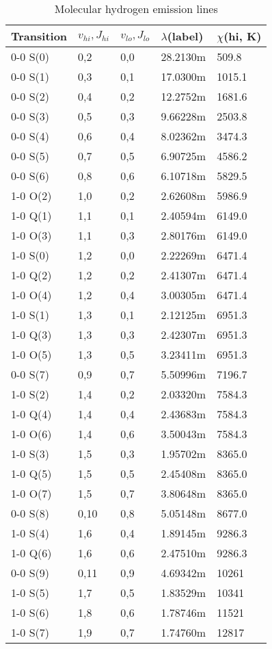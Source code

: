 \begin{table}
\centering
\caption{\label{tab:MolecularHydrogenLines}Molecular hydrogen emission lines}
\begin{tabular}{lllll}
\hline
Transition& $v_{hi},J_{hi}$& $v_{lo},J_{lo}$& $\lambda$(label)& $\chi$(hi,
K)\\
\hline
0-0 S(0)& 0,2 & 0,0& 28.2130m & 509.8\\
0-0 S(1)& 0,3 & 0,1& 17.0300m & 1015.1\\
0-0 S(2)& 0,4 & 0,2& 12.2752m & 1681.6\\
0-0 S(3)& 0,5 & 0,3& 9.66228m & 2503.8\\
0-0 S(4)& 0,6 & 0,4& 8.02362m & 3474.3\\
0-0 S(5)& 0,7 & 0,5& 6.90725m & 4586.2\\
0-0 S(6)& 0,8 & 0,6& 6.10718m & 5829.5\\
1-0 O(2)& 1,0 & 0,2& 2.62608m & 5986.9\\
1-0 Q(1)& 1,1 & 0,1& 2.40594m & 6149.0\\
1-0 O(3)& 1,1 & 0,3& 2.80176m & 6149.0\\
1-0 S(0)& 1,2 & 0,0& 2.22269m & 6471.4\\
1-0 Q(2)& 1,2 & 0,2& 2.41307m & 6471.4\\
1-0 O(4)& 1,2 & 0,4& 3.00305m & 6471.4\\
1-0 S(1)& 1,3 & 0,1& 2.12125m & 6951.3\\
1-0 Q(3)& 1,3 & 0,3& 2.42307m & 6951.3\\
1-0 O(5)& 1,3 & 0,5& 3.23411m & 6951.3\\
0-0 S(7)& 0,9 & 0,7& 5.50996m & 7196.7\\
1-0 S(2)& 1,4 & 0,2& 2.03320m & 7584.3\\
1-0 Q(4)& 1,4 & 0,4& 2.43683m & 7584.3\\
1-0 O(6)& 1,4 & 0,6& 3.50043m & 7584.3\\
1-0 S(3)& 1,5 & 0,3& 1.95702m & 8365.0\\
1-0 Q(5)& 1,5 & 0,5& 2.45408m & 8365.0\\
1-0 O(7)& 1,5 & 0,7& 3.80648m & 8365.0\\
0-0 S(8)& 0,10& 0,8& 5.05148m & 8677.0\\
1-0 S(4)& 1,6 & 0,4& 1.89145m & 9286.3\\
1-0 Q(6)& 1,6 & 0,6& 2.47510m & 9286.3\\
0-0 S(9)& 0,11& 0,9& 4.69342m & 10261\\
1-0 S(5)& 1,7 & 0,5& 1.83529m & 10341\\
1-0 S(6)& 1,8 & 0,6& 1.78746m & 11521\\
1-0 S(7)& 1,9 & 0,7& 1.74760m & 12817\\
\hline
\end{tabular}
\end{table}

